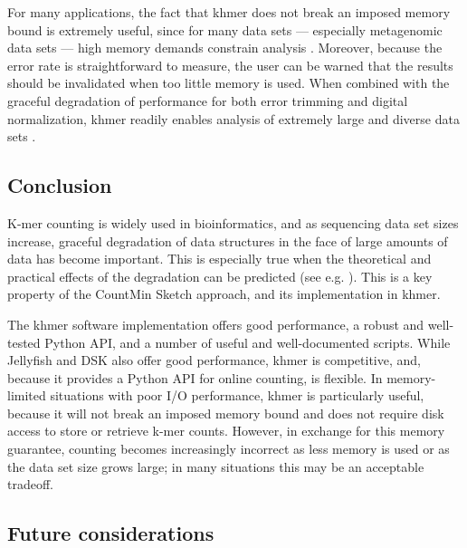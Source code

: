\documentclass{article}
\begin{document}
For many applications, the fact that khmer does not break an imposed
memory bound is extremely useful, since for many data sets ---
especially metagenomic data sets --- high memory demands constrain analysis \cite{Howe2012,Luo2009}.  Moreover, because the error
rate is straightforward to measure, the user can be warned that the
results should be invalidated when too little memory is used.  When combined
with the graceful degradation of performance for both error trimming
and digital normalization, khmer readily enables analysis of extremely
large and diverse data sets \cite{adina2013}.

\subsection{Conclusion}

K-mer counting is widely used in bioinformatics, and as sequencing data set sizes
increase, graceful degradation of data structures in the face of large
amounts of data has become important.  This is especially true when
the theoretical and practical effects of the degradation can be
predicted (see e.g. \cite{Melsted2011, Pell2012, Roy2013}).  This
is a key property of the CountMin Sketch
approach, and its implementation in khmer.

The khmer software implementation offers good performance, a robust
and well-tested Python API, and a number of useful and well-documented
scripts.  While Jellyfish and DSK also offer good performance,
khmer is competitive, and, because it provides a
Python API for online counting, is flexible.  In memory-limited
situations with poor I/O performance, khmer is particularly useful,
because it will not break an imposed memory bound and does not require
disk access to store or retrieve k-mer counts.  However, in exchange
for this memory guarantee, counting becomes increasingly incorrect as
less memory is used or as the data set size grows large; in many
situations this may be an acceptable tradeoff.

\subsection{Future considerations}
\end{document}
